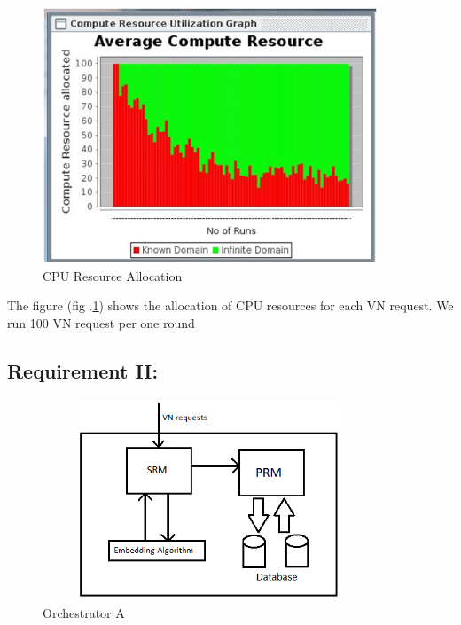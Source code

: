\documentclass[article,dr=phil,type=msc ,colorback,accentcolor=tud4b]{tudthesis}
\begin{document}
\begin{figure}[h]
	\centering
	\includegraphics[width=10cm]{CPU_PE.png}
	\caption{CPU Resource Allocation}
	\label{cpu_alloc}
\end{figure}

The figure (fig .\ref{cpu_alloc}) shows the allocation of CPU resources for each VN request. We run 100 VN request per one round



\newpage
\subsection{Requirement II: }

\begin{figure}[h]
	\centering
	\includegraphics[width=10cm, height=6cm]{orch.jpg}
	\caption{Orchestrator A}
	\label{fig: Orchestrator A}
\end{figure}
\end{document}
